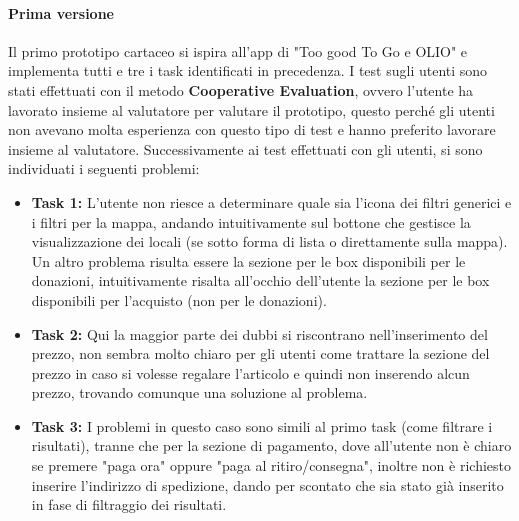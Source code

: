 \documentclass{article}
\begin{document}
\paragraph{Prima versione}
\mbox{}
\newline
Il primo prototipo cartaceo si ispira all'app di "Too good To Go e OLIO" e implementa tutti e tre i task identificati in precedenza.
I test sugli utenti sono stati effettuati con il metodo \textbf{Cooperative Evaluation}, ovvero l'utente ha lavorato insieme al valutatore per valutare il prototipo, questo perché gli utenti non avevano molta esperienza con questo tipo di test e hanno preferito lavorare insieme al valutatore.
Successivamente ai test effettuati con gli utenti, si sono individuati i seguenti problemi:
\begin{itemize}
    \item \textbf{Task 1:} L'utente non riesce a determinare quale sia l'icona dei filtri generici e i filtri per la mappa, andando intuitivamente sul bottone che gestisce la visualizzazione dei locali (se sotto forma di lista o direttamente sulla mappa). Un altro problema risulta essere la sezione per le box disponibili per le donazioni, intuitivamente risalta all'occhio dell'utente la sezione per le box disponibili per l'acquisto (non per le donazioni).
    \item \textbf{Task 2:} Qui la maggior parte dei dubbi si riscontrano nell'inserimento del prezzo, non sembra molto chiaro per gli utenti come trattare la sezione del prezzo in caso si volesse regalare l'articolo e quindi non inserendo alcun prezzo, trovando comunque una soluzione al problema.
    \item \textbf{Task 3:} I problemi in questo caso sono simili al primo task (come filtrare i risultati), tranne che per la sezione di pagamento, dove all'utente non è chiaro se premere "paga ora" oppure "paga al ritiro/consegna", inoltre non è richiesto inserire l'indirizzo di spedizione, dando per scontato che sia stato già inserito in fase di filtraggio dei risultati.
\end{itemize}
\end{document}

